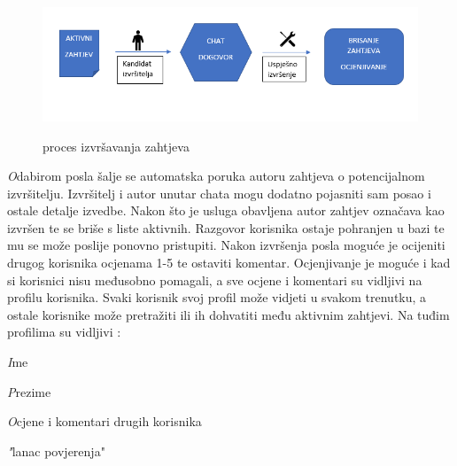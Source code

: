 		\begin{figure}[H]
			\includegraphics[scale=0.7]{slike/projekt2.png} %
			\centering
			\caption \newline proces izvršavanja zahtjeva
			\label{fig:promjene}
		\end{figure}

        \textit Odabirom posla šalje se automatska poruka autoru zahtjeva o potencijalnom izvršitelju. Izvršitelj i autor unutar chata mogu dodatno pojasniti sam posao i ostale detalje izvedbe. Nakon što je usluga obavljena autor zahtjev označava kao izvršen te se briše s liste aktivnih. Razgovor korisnika ostaje pohranjen u bazi te mu se može poslije ponovno pristupiti. 
        \newline
Nakon izvršenja posla moguće je ocijeniti drugog korisnika ocjenama 1-5 te ostaviti komentar. Ocjenjivanje je moguće i kad si korisnici nisu međusobno pomagali, a sve ocjene i komentari su vidljivi na profilu korisnika.
        \newline
Svaki korisnik svoj profil može vidjeti u svakom trenutku, a ostale korisnike može pretražiti ili ih dohvatiti među aktivnim zahtjevi. Na tuđim profilima su vidljivi :
		
		\begin{packed_item}
			\item \textit Ime
			\item \textit Prezime
			\item \textit Ocjene i komentari drugih korisnika
			\item \textit "lanac povjerenja"

		\end{packed_item}
		
